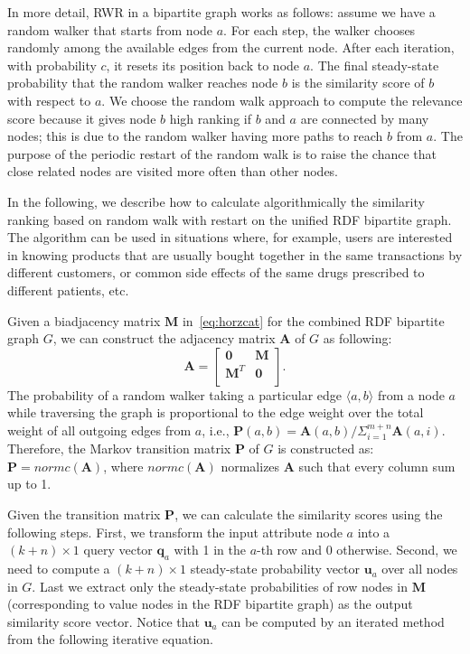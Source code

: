 In more detail, RWR in a bipartite graph works as follows: assume we have a random walker that starts from node $a$. For each step, the walker chooses randomly among the available edges from the current node. After each iteration, with probability $c$, it resets its position back to node $a$. The final steady-state probability that the random walker reaches node $b$ is the similarity score of $b$ with respect to $a$. We choose the random walk approach to compute the relevance score because it gives node $b$ high ranking if $b$ and $a$ are connected by many nodes; this is due to the random walker having more paths to reach $b$ from $a$. The purpose of the periodic restart of the random walk is to raise the chance that close related nodes are visited more often than other nodes.

In the following, we describe how to calculate algorithmically the similarity ranking based on random walk with restart on the unified RDF bipartite graph. The algorithm can be used in situations where, for example, users are interested in knowing products that are usually bought together in the same transactions by different customers, or common side effects of the same drugs prescribed to different patients, etc.

Given a biadjacency matrix $\mathbf{M}$ in~\ref{eq:horzcat} for the combined RDF bipartite graph $G$, we can construct the adjacency matrix $\mathbf{A}$ of $G$ as following:
\[
\mathbf{A}=\left[
               \begin{array}{cc}
                 \mathbf{0}   & \mathbf{M} \\
                 \mathbf{M}^T & \mathbf{0} \\
               \end{array}
             \right].
\]
The probability of a random walker taking a particular edge $\langle a,b\rangle$ from a node $a$ while traversing the graph is proportional to the edge weight over the total weight of all outgoing edges from $a$, i.e., $\mathbf{P}(a,b)=\mathbf{A}(a,b)/\Sigma_{i=1}^{m+n}\mathbf{A}(a,i)$. Therefore, the Markov transition matrix $\mathbf{P}$ of $G$ is constructed as: $\mathbf{P}=normc(\mathbf{A})$, where $normc(\mathbf{A})$ normalizes $\mathbf{A}$ such that every column sum up to 1.

Given the transition matrix $\mathbf{P}$, we can calculate the similarity scores using the following steps. First, we transform the input attribute node $a$ into a $(k+n) \times 1$ query vector $\mathbf{q}_a$ with 1 in the $a$-th row and 0 otherwise. Second, we need to compute a $(k+n)\times 1$ steady-state probability vector $\mathbf{u}_a$ over all nodes in $G$. Last we extract only the steady-state probabilities of row nodes in $\mathbf{M}$ (corresponding to value nodes in the RDF bipartite graph) as the output similarity score vector. Notice that $\mathbf{u}_a$ can be computed by an iterated method from the following iterative equation.

